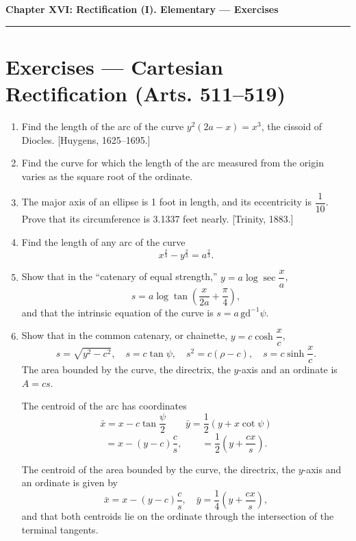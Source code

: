 \documentclass[11pt, a4paper]{article}
\newcommand{\source}[1]{\hfill\textnormal{[#1]}}
\begin{document}
\newpage

\begin{center}
    {\LARGE \bfseries \color{accent} Chapter XVI: Rectification (I). Elementary --- Exercises}\\
    \vspace{0.2cm}
    {\color{accent}\rule{0.55\linewidth}{0.8pt}}
\end{center}
\vspace{0.35cm}

\section*{Exercises --- Cartesian Rectification (Arts. 511--519)}

\begin{enumerate}[leftmargin=2em]

\item Find the length of the arc of the curve $y^2(2a-x)=x^3$, the cissoid of Diocles. \source{Huygens, 1625--1695.}

\item Find the curve for which the length of the arc measured from the origin varies as the square root of the ordinate.

\item The major axis of an ellipse is 1 foot in length, and its eccentricity is $\dfrac{1}{10}$. Prove that its circumference is 3.1337 feet nearly. \source{Trinity, 1883.}

\item Find the length of any arc of the curve
\[
x^{\frac23}-y^{\frac23}=a^{\frac23}.
\]

\item Show that in the ``catenary of equal strength,'' $y=a\log\sec\dfrac{x}{a}$,
\[
s=a\log\tan\left(\frac{x}{2a}+\frac{\pi}{4}\right),
\]
and that the intrinsic equation of the curve is $s=a\,\mathrm{gd}^{-1}\psi$.

\item Show that in the common catenary, or chainette, $y=c\cosh\dfrac{x}{c}$,
\[
s=\sqrt{y^2-c^2},\quad s=c\tan\psi,\quad s^2=c(\rho-c),\quad s=c\sinh\frac{x}{c}.
\]
The area bounded by the curve, the directrix, the $y$-axis and an ordinate is $A=cs$.

The centroid of the arc has coordinates
\[
\bar x=x-c\tan\frac{\psi}{2}\qquad \bar y=\frac12(y+x\cot\psi)
\]
\[
=x-(y-c)\frac{c}{s},\qquad=\frac12\left(y+\frac{cx}{s}\right).
\]

The centroid of the area bounded by the curve, the directrix, the $y$-axis and an ordinate is given by
\[
\bar x=x-(y-c)\frac{c}{s},\quad \bar y=\frac14\left(y+\frac{cx}{s}\right),
\]
and that both centroids lie on the ordinate through the intersection of the terminal tangents.


\end{enumerate}
\end{document}
